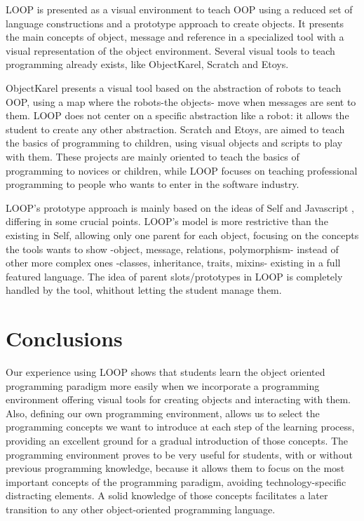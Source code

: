 \documentclass{sigplanconf}
\begin{document}
LOOP is presented as a visual environment to teach OOP using a reduced set of language constructions and a prototype approach to create objects.  It presents the main concepts of object, message and reference in a specialized tool with a visual representation of the object environment.  Several visual tools to teach programming already exists, like ObjectKarel\cite{Findl02}, Scratch\cite{Utti10} and Etoys\cite{Kay05}.

ObjectKarel presents a visual tool based on the abstraction of robots to teach OOP, using a map where the robots-the objects- move when messages are sent to them.  LOOP does not center on a specific abstraction like a robot: it allows the student to create any other abstraction.  Scratch and Etoys, are aimed to teach the basics of programming to children, using visual objects and scripts to play with them.  These projects are mainly oriented to teach the basics of programming to novices or children, while LOOP focuses on teaching professional programming to people who wants to enter in the software industry.

LOOP's prototype approach is mainly based on the ideas of Self \cite{Unga07} and Javascript \cite{Wilk02}, differing in some crucial points.  LOOP's model is more restrictive than the existing in Self, allowing only one parent for each object, focusing on the concepts the tools wants to show -object, message, relations, polymorphism- instead of other more complex ones -classes, inheritance, traits, mixins- existing in a full featured language.  The idea of parent slots/prototypes in LOOP is completely handled by the tool, whithout letting the student manage them.

\section{Conclusions}

Our experience using LOOP shows that students learn the object oriented programming paradigm more easily when we incorporate a programming environment offering visual tools for creating objects and interacting with them. Also, defining our own programming environment, allows us to select the programming concepts we want to introduce at each step of the learning process, providing an excellent ground for a gradual introduction of those concepts. The programming environment proves to be very useful for students, with or without previous programming knowledge, because it allows them to focus on the most important concepts of the programming paradigm, avoiding technology-specific distracting elements. A solid knowledge of those concepts facilitates a later transition to any other object-oriented programming language.
\end{document}
